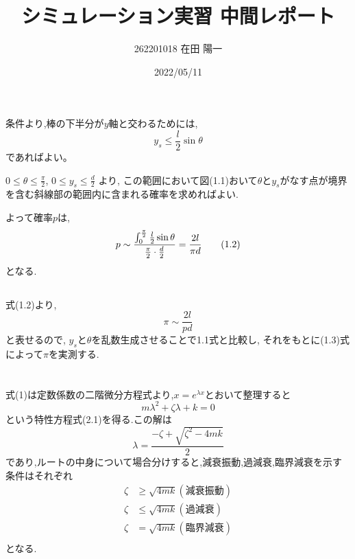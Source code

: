 \documentclass[a4paper]{jarticle}
\begin{document}
\title{シミュレーション実習 中間レポート}
\author{262201018 在田 陽一}
\date{2022/05/11}
\maketitle


\section{}
\subsection{}
\noindent
条件より,棒の下半分が$y$軸と交わるためには,
\begin{equation}
     y_s \leq \frac{l}{2}\sin\theta \tag{1.1}
\end{equation}
であればよい。

\noindent
$0 \leq \theta \leq \frac{\pi}{2}$, $0 \leq y_s \leq \frac{d}{2}$ より,
この範囲において図(1.1)おいて$\theta$と$y_s$がなす点が境界を含む斜線部の範囲内に含まれる確率を求めればよい.

\noindent
よって確率$p$は,
\begin{equation}
    p \sim \frac{\int^\frac{\pi}{2}_0 \frac{l}{2}\sin \theta}{\frac{\pi}{2} \cdot \frac{d}{2}} \\
     =\frac{2l}{\pi d} \tag{1.2}
\end{equation}
となる.

\subsection{}
\noindent
式(1.2)より,
\begin{equation}
   \pi \sim  \frac{2l}{pd} \tag{1.3}
\end{equation}
と表せるので, $y_s$と$\theta$を乱数生成させることで1.1式と比較し,
それをもとに(1.3)式によって$\pi$を実測する.

\section{}
\subsection{}
\noindent
式(1)は定数係数の二階微分方程式より,$x=e^{\lambda x}$とおいて整理すると
\begin{equation}
    m\lambda^2 + \zeta\lambda + k = 0 \tag{2.1}
\end{equation}
という特性方程式(2.1)を得る.この解は
\begin{equation}
    \lambda = \frac{-\zeta + \sqrt{\zeta^2 - 4mk}}{2} \tag{2.2}
\end{equation}
であり,ルートの中身について場合分けすると,減衰振動,過減衰,臨界減衰を示す条件はそれぞれ
\begin{align*}
    \zeta & \geq \sqrt{4mk}　　 (減衰振動) \tag{2.3}\\
    \zeta & \leq \sqrt{4mk}　　 (過減衰) \tag{2.4}\\
    \zeta & = \sqrt{4mk}　　 (臨界減衰) \tag{2.5}\\
\end{align*}
となる.
\end{document}
